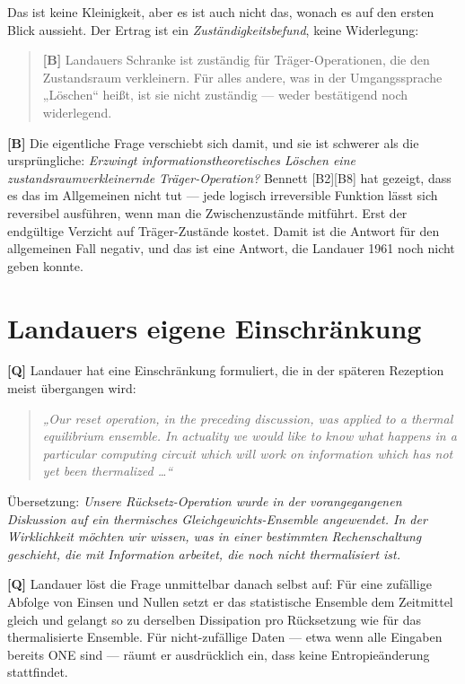 Das ist keine Kleinigkeit, aber es ist auch nicht das, wonach es auf den ersten
Blick aussieht. Der Ertrag ist ein \emph{Zuständigkeitsbefund}, keine Widerlegung:

\begin{quote}
\textbf{[B]} Landauers Schranke ist zuständig für Träger-Operationen, die den
Zustandsraum verkleinern. Für alles andere, was in der Umgangssprache „Löschen“
heißt, ist sie nicht zuständig --- weder bestätigend noch widerlegend.
\end{quote}

\textbf{[B]} Die eigentliche Frage verschiebt sich damit, und sie ist schwerer als die
ursprüngliche: \emph{Erzwingt informationstheoretisches Löschen eine
zustandsraumverkleinernde Träger-Operation?} Bennett [B2][B8] hat gezeigt, dass es
das im Allgemeinen nicht tut --- jede logisch irreversible Funktion lässt sich
reversibel ausführen, wenn man die Zwischenzustände mitführt. Erst der endgültige
Verzicht auf Träger-Zustände kostet. Damit ist die Antwort für den allgemeinen
Fall negativ, und das ist eine Antwort, die Landauer 1961 noch nicht geben konnte.

\section{Landauers eigene Einschränkung}

\textbf{[Q]} Landauer hat eine Einschränkung formuliert, die in der späteren Rezeption
meist übergangen wird:

\begin{quote}
\itshape
„Our reset operation, in the preceding discussion, was applied to a thermal
equilibrium ensemble. In actuality we would like to know what happens in a
particular computing circuit which will work on information which has not yet been
thermalized \ldots“ \upshape [B1]
\end{quote}

Übersetzung: \emph{Unsere Rücksetz-Operation wurde in der vorangegangenen
Diskussion auf ein thermisches Gleichgewichts-Ensemble angewendet. In der
Wirklichkeit möchten wir wissen, was in einer bestimmten Rechenschaltung
geschieht, die mit Information arbeitet, die noch nicht thermalisiert ist.}

\textbf{[Q]} Landauer löst die Frage unmittelbar danach selbst auf: Für eine zufällige
Abfolge von Einsen und Nullen setzt er das statistische Ensemble dem Zeitmittel
gleich und gelangt so zu derselben Dissipation pro Rücksetzung wie für das
thermalisierte Ensemble. Für nicht-zufällige Daten --- etwa wenn alle Eingaben
bereits \textup{ONE} sind --- räumt er ausdrücklich ein, dass keine
Entropieänderung stattfindet.


